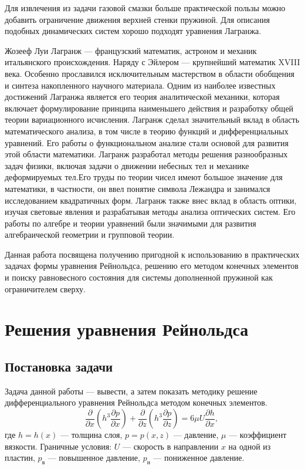 \documentclass[a4paper,14pt]{extarticle}
\begin{document}
Для извлечения из задачи газовой смазки больше практической пользы можно добавить ограничение движения верхней стенки пружиной. Для описания подобных динамических систем хорошо подходят уравнения Лагранжа.

Жозееф Луи Лагранж --- французский математик, астроном и механик итальянского происхождения. Наряду с Эйлером — крупнейший математик XVIII века. Особенно прославился исключительным мастерством в области обобщения и синтеза накопленного научного материала. Одним из наиболее известных достижений Лагранжа является его теория аналитической механики, которая включает формулирование принципа наименьшего действия и разработку общей теории вариационного исчисления.  Лагранж сделал значительный вклад в область математического анализа, в том числе в теорию функций и дифференциальных уравнений. Его работы о функциональном анализе стали основой для развития этой области математики. Лагранж разработал методы решения разнообразных задач физики, включая задачи о движении небесных тел и механике деформируемых тел.Его труды по теории чисел имеют большое значение для математики, в частности, он ввел понятие символа Лежандра и занимался исследованием квадратичных форм. Лагранж также внес вклад в область оптики, изучая световые явления и разрабатывая методы анализа оптических систем. Его работы по алгебре и теории уравнений были значимыми для развития алгебраической геометрии и групповой теории.

Данная работа посвящена получению пригодной к использованию в практических задачах формы уравнения Рейнольдса, решению его методом конечных элементов и поиску равновесного состояния для системы дополненной пружиной как ограничителем сверху.

\section{Решения уравнения Рейнольдса}

\subsection{Постановка задачи}
Задача данной работы --- вывести, а затем показать методику решение дифференциального уравнения Рейнольдса методом конечных элементов.
\begin{equation}
	\label{reinolts-task}
	\frac{\partial}{\partial x} \left(h^3 \frac{\partial p}{\partial x} \right) + \frac{\partial}{\partial z} \left(h^3 \frac{\partial p}{\partial z} \right) = 6 \mu U \frac{\partial h}{\partial x} \text{, }
\end{equation}
где $h = h(x)$ --- толщина слоя, $p = p(x, z)$ --- давление, $\mu$ --- коэффициент вязкости. Граничные условия: $U$ --- скорость в направлении $x$ на одной из пластин, $p_{\text{в}}$ --- повышенное давление, $p_{\text{н}}$ --- пониженное давление. 
\end{document}
